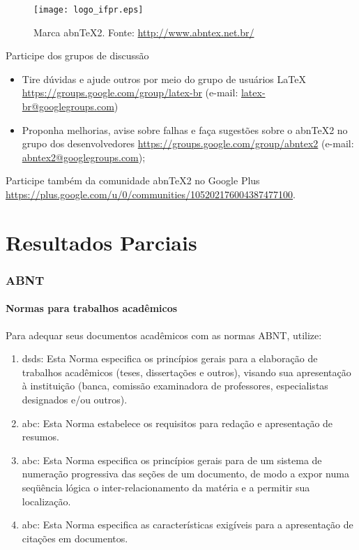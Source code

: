 \documentclass[aspectratio=169]{beamer}
\begin{document}
\begin{frame}

\begin{figure}
  \centering
  \texttt{[image: logo\_ifpr.eps]}
  \caption{Marca abnTeX2. Fonte: \url{http://www.abntex.net.br/}}
\end{figure}

\end{frame}

\begin{frame}{Participe dos grupos de discussão}

\begin{itemize}
  \item Tire dúvidas e ajude outros por meio do grupo de usuários LaTeX
  \url{https://groups.google.com/group/latex-br} (e-mail:
  \url{latex-br@googlegroups.com})
  
  \item Proponha melhorias, avise sobre falhas e faça sugestões sobre o abnTeX2
  no grupo dos desenvolvedores \url{https://groups.google.com/group/abntex2}
  (e-mail: \url{abntex2@googlegroups.com});
\end{itemize}

Participe também da comunidade abnTeX2 no Google Plus
\url{https://plus.google.com/u/0/communities/105202176004387477100}.

\end{frame}

\section{Resultados Parciais}

\begin{frame}
\frametitle{ABNT}
\framesubtitle{Normas para trabalhos acadêmicos}

Para adequar seus documentos acadêmicos com as normas ABNT, utilize:
\begin{enumerate}
 \item dsds: Esta Norma especifica os princípios gerais
 para a elaboração de trabalhos acadêmicos (teses, dissertações e outros),
 visando sua apresentação à instituição (banca, comissão examinadora de
 professores, especialistas designados e/ou outros).
 
 \item abc: Esta Norma estabelece os requisitos para
 redação e apresentação de resumos.
 
 \item abc: Esta Norma especifica os princípios gerais
 para de um sistema de numeração progressiva das seções de um documento, de
 modo a expor numa seqüência lógica o inter-relacionamento da matéria e a
 permitir sua localização.
 
 \item abc: Esta Norma especifica as características
 exigíveis para a apresentação de citações em documentos.
\end{enumerate}

\end{frame}
\end{document}
